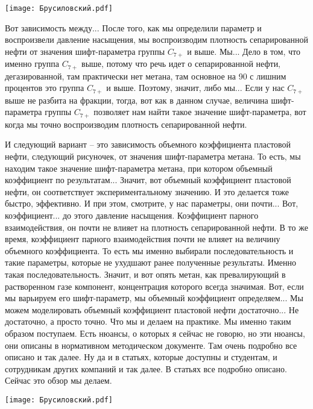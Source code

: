 \documentclass[main.tex]{subfiles}
\begin{document}
\begin{center}
\texttt{[image: Брусиловский.pdf]}
\end{center}

Вот зависимость между...
После того, как мы определили параметр и воспроизвели давление насыщения, мы воспроизводим плотность сепарированной нефти от значения шифт-параметра группы $C_{7+}$ и выше.
Мы...
Дело в том, что именно группа $C_{7+}$ выше, потому что речь идет о сепарированной нефти, дегазированной, там практически нет метана, там основное на 90 с лишним процентов это группа $C_{7+}$ и выше.
Поэтому, значит, либо мы...
Если у нас $C_{7+}$ выше не разбита на фракции, тогда, вот как в данном случае, величина шифт-параметра группы $C_{7+}$ позволяет нам найти такое значение шифт-параметра, вот когда мы точно воспроизводим плотность сепарированной нефти.

И следующий вариант -- это зависимость объемного коэффициента пластовой нефти, следующий рисуночек, от значения шифт-параметра метана.
То есть, мы находим такое значение шифт-параметра метана, при котором объемный коэффициент по результатам...
Значит, вот объемный коэффициент пластовой нефти, он соответствует экспериментальному значению.
И это делается тоже быстро, эффективно.
И при этом, смотрите, у нас параметры, они почти...
Вот, коэффициент... до этого давление насыщения.
Коэффициент парного взаимодействия, он почти не влияет на плотность сепарированной нефти.
В то же время, коэффициент парного взаимодействия почти не влияет на величину объемного коэффициента.
То есть мы именно выбирали последовательность и такие параметры, которые не ухудшают ранее полученные результаты.
Именно такая последовательность.
Значит, и вот опять метан, как превалирующий в растворенном газе компонент, концентрация которого всегда значимая.
Вот, если мы варьируем его шифт-параметр, мы объемный коэффициент определяем...
Мы можем моделировать объемный коэффициент пластовой нефти достаточно...
Не достаточно, а просто точно.
Что мы и делаем на практике.
Мы именно таким образом поступаем.
Есть нюансы, о которых я сейчас не говорю, но эти нюансы, они описаны в нормативном методическом документе.
Там очень подробно все описано и так далее.
Ну да и в статьях, которые доступны и студентам, и сотрудникам других компаний и так далее.
В статьях все подробно описано.
Сейчас это обзор мы делаем.

\begin{center}
\texttt{[image: Брусиловский.pdf]}
\end{center}
\end{document}
